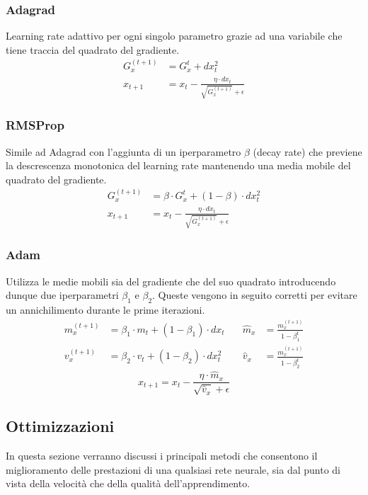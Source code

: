 \subsubsection{Adagrad}\cite{Adagrad}
Learning rate adattivo per ogni singolo parametro grazie ad una variabile che tiene traccia del quadrato del gradiente.
\begin{align*}
	G_{x}^{(t+1)} &= G_x^{t} + dx_t^2 \\
	x_{t+1} &= x_t - \frac{\eta \cdot dx_t}{\sqrt{G_x^{(t+1)}} + \epsilon}
\end{align*}
\subsubsection{RMSProp}\cite{RMSProp}
Simile ad Adagrad con l'aggiunta di un iperparametro $\beta$ (decay rate) che previene la descrescenza monotonica del learning rate mantenendo una media mobile del quadrato del gradiente.
\begin{align*}
	G_x^{(t+1)} &= \beta \cdot G_x^t + (1 - \beta) \cdot dx_t^2 \\
	x_{t+1} &= x_t - \frac{\eta \cdot dx_t}{\sqrt{G_x^{(t+1)}} + \epsilon}
\end{align*}
\subsubsection{Adam}\cite{Adam}
Utilizza le medie mobili sia del gradiente che del suo quadrato introducendo dunque due iperparametri $\beta_1$ e $\beta_2$. Queste vengono in seguito corretti per evitare un annichilimento durante le prime iterazioni. 
\begin{align*}
	m_x^{(t+1)} &= \beta_1 \cdot m_t + (1-\beta_1) \cdot dx_t \quad&
	\hat{m}_x &= \frac{m_x^{(t+1)}}{1 - \beta_1^t} \\
	v_x^{(t+1)} &= \beta_2 \cdot v_t + (1-\beta_2) \cdot dx_t^2 \quad&
	\hat{v}_x &= \frac{m_x^{(t+1)}}{1 - \beta_2^t}
\end{align*}
$$
  x_{t+1} = x_t - \frac{\eta \cdot \hat{m}_x}{\sqrt{\hat{v}_x} + \epsilon}
$$

\subsection{Ottimizzazioni}

In questa sezione verranno discussi i principali metodi che consentono il miglioramento delle prestazioni di una qualsiasi rete neurale, sia dal punto di vista della velocità che della qualità dell'apprendimento.

